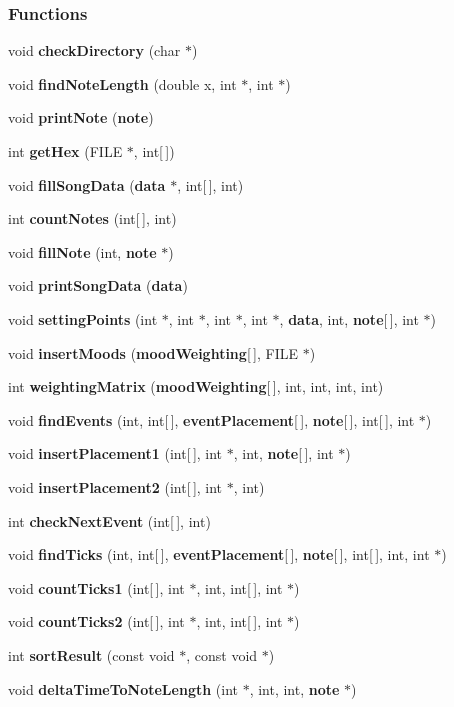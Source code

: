 \subsubsection*{Functions}
\begin{DoxyCompactItemize}
\item 
void {\bf check\+Directory} (char $\ast$)
\item 
void {\bf find\+Note\+Length} (double x, int $\ast$, int $\ast$)
\item 
void {\bf print\+Note} ({\bf note})
\item 
int {\bf get\+Hex} (F\+I\+L\+E $\ast$, int[$\,$])
\item 
void {\bf fill\+Song\+Data} ({\bf data} $\ast$, int[$\,$], int)
\item 
int {\bf count\+Notes} (int[$\,$], int)
\item 
void {\bf fill\+Note} (int, {\bf note} $\ast$)
\item 
void {\bf print\+Song\+Data} ({\bf data})
\item 
void {\bf setting\+Points} (int $\ast$, int $\ast$, int $\ast$, int $\ast$, {\bf data}, int, {\bf note}[$\,$], int $\ast$)
\item 
void {\bf insert\+Moods} ({\bf mood\+Weighting}[$\,$], F\+I\+L\+E $\ast$)
\item 
int {\bf weighting\+Matrix} ({\bf mood\+Weighting}[$\,$], int, int, int, int)
\item 
void {\bf find\+Events} (int, int[$\,$], {\bf event\+Placement}[$\,$], {\bf note}[$\,$], int[$\,$], int $\ast$)
\item 
void {\bf insert\+Placement1} (int[$\,$], int $\ast$, int, {\bf note}[$\,$], int $\ast$)
\item 
void {\bf insert\+Placement2} (int[$\,$], int $\ast$, int)
\item 
int {\bf check\+Next\+Event} (int[$\,$], int)
\item 
void {\bf find\+Ticks} (int, int[$\,$], {\bf event\+Placement}[$\,$], {\bf note}[$\,$], int[$\,$], int, int $\ast$)
\item 
void {\bf count\+Ticks1} (int[$\,$], int $\ast$, int, int[$\,$], int $\ast$)
\item 
void {\bf count\+Ticks2} (int[$\,$], int $\ast$, int, int[$\,$], int $\ast$)
\item 
int {\bf sort\+Result} (const void $\ast$, const void $\ast$)
\item 
void {\bf delta\+Time\+To\+Note\+Length} (int $\ast$, int, int, {\bf note} $\ast$)
\item 

\end{DoxyCompactItemize}
